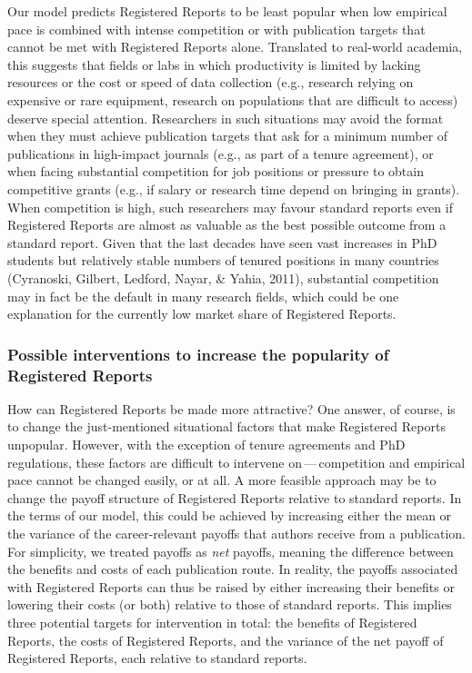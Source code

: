 \documentclass[
  ,man,mask,floatsintext]{apa6}
\begin{document}
Our model predicts Registered Reports to be least popular when low empirical pace is combined with intense competition or with publication targets that cannot be met with Registered Reports alone.
Translated to real-world academia, this suggests that fields or labs in which productivity is limited by lacking resources or the cost or speed of data collection (e.g., research relying on expensive or rare equipment, research on populations that are difficult to access) deserve special attention.
Researchers in such situations may avoid the format when they must achieve publication targets that ask for a minimum number of publications in high-impact journals (e.g., as part of a tenure agreement), or when facing substantial competition for job positions or pressure to obtain competitive grants (e.g., if salary or research time depend on bringing in grants).
When competition is high, such researchers may favour standard reports even if Registered Reports are almost as valuable as the best possible outcome from a standard report.
Given that the last decades have seen vast increases in PhD students but relatively stable numbers of tenured positions in many countries (Cyranoski, Gilbert, Ledford, Nayar, \& Yahia, 2011), substantial competition may in fact be the default in many research fields, which could be one explanation for the currently low market share of Registered Reports.

\par\vspace{.8\baselineskip}

\hypertarget{possible-interventions-to-increase-the-popularity-of-registered-reports}{%
\subsubsection{Possible interventions to increase the popularity of Registered Reports}\label{possible-interventions-to-increase-the-popularity-of-registered-reports}}

How can Registered Reports be made more attractive?
One answer, of course, is to change the just-mentioned situational factors that make Registered Reports unpopular.
However,
with the exception of tenure agreements and PhD regulations, these
factors are difficult to intervene on\(\,\)---\(\,\)competition and empirical pace cannot be changed easily, or at all.
A more feasible approach may be to change the payoff structure of Registered Reports relative to standard reports.
In the terms of our model, this could be achieved by increasing either the mean or the variance of the career-relevant payoffs that authors receive from a publication.
For simplicity, we treated payoffs as \emph{net} payoffs, meaning the difference between the benefits and costs of each publication route.
In reality,
the payoffs associated with Registered Reports can thus be raised by either increasing their benefits or lowering their costs (or both) relative to those of standard reports.
This implies three potential targets for intervention in total:
the benefits of Registered Reports, the costs of Registered Reports, and the variance of the net payoff of Registered Reports, each relative to standard reports.
\end{document}
